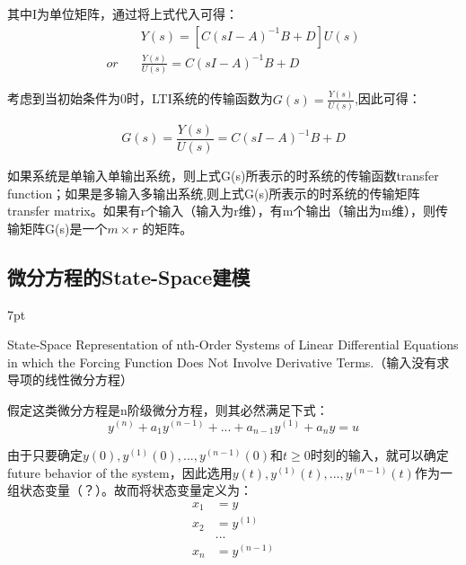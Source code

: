 \documentclass{article}
\numberwithin{equation}{section}
\numberwithin{figure}{section}
\newenvironment{formal}{%
\def\FrameCommand{%
\hspace{1pt}%
{\color{DarkBlue}\vrule width 2pt}%
{\color{formalshade}\vrule width 4pt}%
\colorbox{formalshade}%
}%
\MakeFramed{\advance\hsize-\width\FrameRestore}%
\noindent\hspace{-4.55pt}%
\begin{adjustwidth}{}{7pt}%
\vspace{2pt}\vspace{2pt}%
}
{%
\vspace{2pt}\end{adjustwidth}\endMakeFramed%
}
\begin{document}
其中I为单位矩阵，通过将上式代入可得：
\begin{equation}
    \begin{split}
        &Y(s)=[C(sI-A)^{-1}B+D]U(s)\\
        or \quad &\frac{Y(s)}{U(s)}=C(sI-A)^{-1}B+D
    \end{split}
\end{equation}

考虑到当初始条件为0时，LTI系统的传输函数为$G(s)=\frac{Y(s)}{U(s)}$,因此可得：

\begin{equation}
    G(s)=\frac{Y(s)}{U(s)}=C(sI-A)^{-1}B+D
\end{equation}

如果系统是单输入单输出系统，则上式G(s)所表示的时系统的传输函数transfer function；如果是多输入多输出系统,则上式G(s)所表示的时系统的传输矩阵transfer matrix。如果有r个输入（输入为r维），有m个输出（输出为m维），则传输矩阵G(s)是一个$m×r$ 的矩阵。

\subsection{微分方程的State-Space建模}

\begin{formal}
    State-Space Representation of nth-Order Systems of Linear Differential Equations in which the Forcing Function Does Not Involve Derivative Terms.（输入没有求导项的线性微分方程）
\end{formal}

假定这类微分方程是n阶级微分方程，则其必然满足下式：
\begin{equation}
    y^{(n)}+a_1y^{(n-1)}+...+a_{n-1}y^{(1)}+a_ny=u\label{eqffndt}
\end{equation}

由于只要确定$y(0),y^{(1)}(0),...,y^{(n-1)}(0)$和$t≥0$时刻的输入，就可以确定future behavior of the system，因此选用$y(t),y^{(1)}(t),...,y^{(n-1)}(t)$作为一组状态变量（？）。故而将状态变量定义为：
\begin{equation}
    \begin{split}
        x_1&=y\\
        x_2&=y^{(1)}\\
        &...\\
        x_n&=y^{(n-1)}
    \end{split}
\end{equation}
\end{document}

